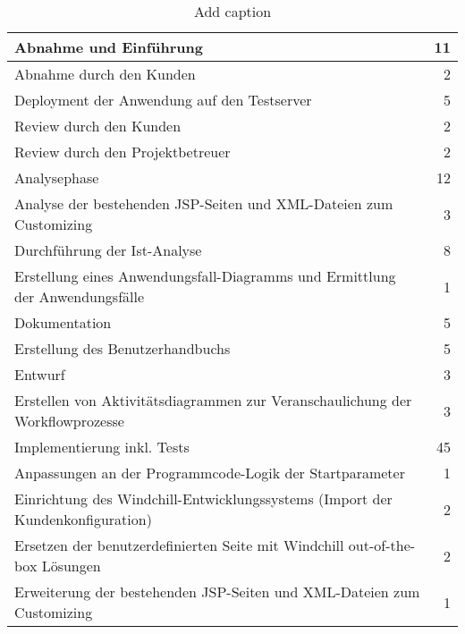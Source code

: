 \begin{table}[htbp]
    \centering
    \caption{Add caption}
    \begin{tabular}{p{28.44em}r}
        \toprule
        \rowcolor[rgb]{ .557,  .663,  .859} Abnahme und Einführung & 11 \\
        \midrule
        Abnahme durch den Kunden & 2 \\
        \midrule
        \rowcolor[rgb]{ .816,  .808,  .808} Deployment der Anwendung auf den Testserver & 5 \\
        \midrule
        Review durch den Kunden & 2 \\
        \midrule
        \rowcolor[rgb]{ .816,  .808,  .808} Review durch den Projektbetreuer & 2 \\
        \midrule
        \rowcolor[rgb]{ .557,  .663,  .859} Analysephase & 12 \\
        \midrule
        Analyse der bestehenden JSP-Seiten und XML-Dateien zum Customizing & 3 \\
        \midrule
        \rowcolor[rgb]{ .816,  .808,  .808} Durchführung der Ist-Analyse & 8 \\
        \midrule
        Erstellung eines Anwendungsfall-Diagramms und Ermittlung der Anwendungsfälle & 1 \\
        \midrule
        \rowcolor[rgb]{ .557,  .663,  .859} Dokumentation & 5 \\
        \midrule
        Erstellung des Benutzerhandbuchs & 5 \\
        \midrule
        \rowcolor[rgb]{ .557,  .663,  .859} Entwurf & 3 \\
        \midrule
        Erstellen von Aktivitätsdiagrammen zur Veranschaulichung der Workflowprozesse & 3 \\
        \midrule
        \rowcolor[rgb]{ .557,  .663,  .859} Implementierung inkl. Tests & 45 \\
        \midrule
        Anpassungen an der Programmcode-Logik der Startparameter & 1 \\
        \midrule
        \rowcolor[rgb]{ .816,  .808,  .808} Einrichtung des Windchill-Entwicklungssystems (Import der Kundenkonfiguration) & 2 \\
        \midrule
        Ersetzen der benutzerdefinierten Seite mit Windchill out-of-the-box Lösungen & 2 \\
        \midrule
        \rowcolor[rgb]{ .816,  .808,  .808} Erweiterung der bestehenden JSP-Seiten und XML-Dateien zum Customizing & 1 \\

\end{tabular}
\end{table}

